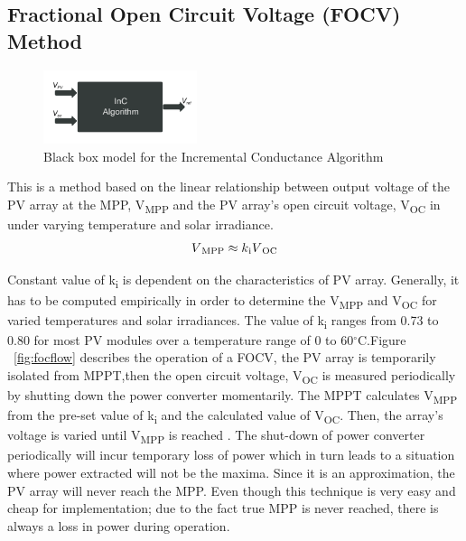 {  \subsection{Fractional Open Circuit Voltage (FOCV) Method  } \label{sec:focv_sec}
  
   \begin{figure}[H]
           \begin{center}
           \includegraphics[width=0.4\textwidth]{images/Frac_block}
           \caption{ Black box model for the Incremental Conductance Algorithm }
           \label{fig:Frac_block}
      \end{center}
    \end{figure}
  This is a method based on the linear relationship between output voltage of the PV array at the \ac{MPP}, V\textsubscript{MPP} and the PV array's open circuit voltage, V\textsubscript{OC} in under varying temperature and solar irradiance. \\
  
  \begin{equation}
    \begin{aligned}
  V\textsubscript{MPP}\approx k\textsubscript{i}V\textsubscript{OC}
  \label{eq:equ_fracoc}
  \end{aligned}
  \end{equation}
  
  Constant value of k\textsubscript{i} is dependent on the characteristics of PV array. Generally, it has to be computed empirically in order to determine the V\textsubscript{MPP} and V\textsubscript{OC} for varied temperatures and solar irradiances. The value of k\textsubscript{i} ranges from 0.73 to 0.80  for most PV modules over a temperature range of 0 to 60$^\circ$C.Figure ~\ref{fig:focflow} describes the operation of a \ac{FOCV}, the PV array is temporarily isolated from \ac{MPPT},then the open circuit voltage, V\textsubscript{OC} is measured periodically by shutting down the power converter momentarily. The \ac{MPPT} calculates V\textsubscript{MPP} from the pre-set value of k\textsubscript{i} and the calculated value of V\textsubscript{OC}. Then, the array's voltage is varied until V\textsubscript{MPP} is  reached . The shut-down of power converter periodically will incur temporary loss of power which in turn leads to a situation where power extracted will not be the maxima. Since it is an approximation, the PV array will never reach the \ac{MPP}. Even though this technique is very easy and cheap for implementation; due to the fact true \ac{MPP} is never reached, there is always a loss in power during operation\cite{ngan2011study}.
  
}
